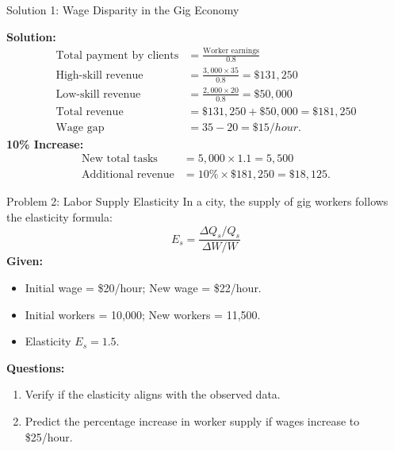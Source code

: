 \documentclass{beamer}
\begin{document}
\begin{frame}{Solution 1: Wage Disparity in the Gig Economy}

    \textbf{Solution:}
    \begin{align*}
        \text{Total payment by clients} &= \frac{\text{Worker earnings}}{0.8} \\
        \text{High-skill revenue} &= \frac{3,000 \times 35}{0.8} = \$131,250 \\
        \text{Low-skill revenue} &= \frac{2,000 \times 20}{0.8} = \$50,000 \\
        \text{Total revenue} &= \$131,250 + \$50,000 = \$181,250 \\
        \text{Wage gap} &= 35 - 20 = \$15/hour.
    \end{align*}
    \textbf{10\% Increase:}
    \begin{align*}
        \text{New total tasks} &= 5,000 \times 1.1 = 5,500 \\
        \text{Additional revenue} &= 10\% \times \$181,250 = \$18,125.
    \end{align*}
\end{frame}





\begin{frame}{Problem 2: Labor Supply Elasticity}
    In a city, the supply of gig workers follows the elasticity formula:
    \[ E_s = \frac{\Delta Q_s / Q_s}{\Delta W / W} \]
    \textbf{Given:}
    \begin{itemize}
        \item Initial wage = \$20/hour; New wage = \$22/hour.
        \item Initial workers = 10,000; New workers = 11,500.
        \item Elasticity \(E_s = 1.5\).
    \end{itemize}
    \textbf{Questions:}
    \begin{enumerate}
        \item Verify if the elasticity aligns with the observed data.
        \item Predict the percentage increase in worker supply if wages increase to \$25/hour.
    \end{enumerate}
\end{frame}
\end{document}
